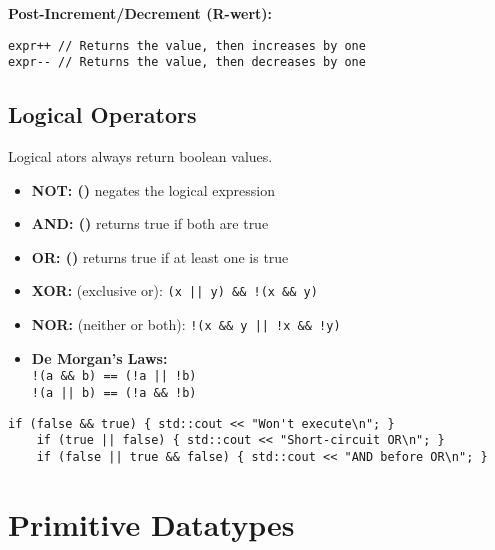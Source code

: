     \textbf{Post-Increment/Decrement (R-wert):} 

       \lstinline[style=CodeExpert]{expr++ // Returns the value, then increases by one} \\
        \lstinline[style=CodeExpert]{expr-- // Returns the value, then decreases by one}  \\
  


\subsection{Logical Operators}
Logical ators always return boolean values.

\begin{itemize}
    \item \textbf{NOT: (\cepink{!})}
    negates the logical expression
    \item \textbf{AND: (\cepink{\&\&})}
    returns true if both are true 
    \item \textbf{OR: (\cepink{||})}
    returns true if at least one is true 
    \item \textbf{XOR:} (exclusive or): 
    \lstinline[style=CodeExpert]{(x || y) && !(x && y)}
    \item \textbf{NOR:} (neither or both): 
    \lstinline[style=CodeExpert]{!(x && y || !x && !y)}
    \item \textbf{De Morgan's Laws:} \\
     \lstinline[style=CodeExpert]{!(a && b) == (!a || !b)}\\
    \lstinline[style=CodeExpert]{!(a || b) == (!a && !b)}
\end{itemize}


\begin{lstlisting}[style = codeexpert]
    if (false && true) { std::cout << "Won't execute\n"; }
    if (true || false) { std::cout << "Short-circuit OR\n"; }
    if (false || true && false) { std::cout << "AND before OR\n"; }
\end{lstlisting}




\section{Primitive Datatypes}



